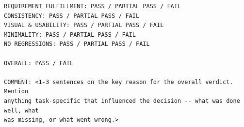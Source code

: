 \documentclass[sigconf,nonacm]{acmart}
\begin{document}
\begin{mdframed}[style=promptbox]
\begin{lstlisting}[basicstyle=\scriptsize\ttfamily, breaklines=true, breakatwhitespace=true,
                   xleftmargin=0pt, xrightmargin=0pt]
REQUIREMENT FULFILLMENT: PASS / PARTIAL PASS / FAIL
CONSISTENCY: PASS / PARTIAL PASS / FAIL
VISUAL & USABILITY: PASS / PARTIAL PASS / FAIL
MINIMALITY: PASS / PARTIAL PASS / FAIL
NO REGRESSIONS: PASS / PARTIAL PASS / FAIL

OVERALL: PASS / FAIL

COMMENT: <1-3 sentences on the key reason for the overall verdict. Mention
anything task-specific that influenced the decision -- what was done well, what
was missing, or what went wrong.>
\end{lstlisting}
\end{mdframed}
\end{document}
